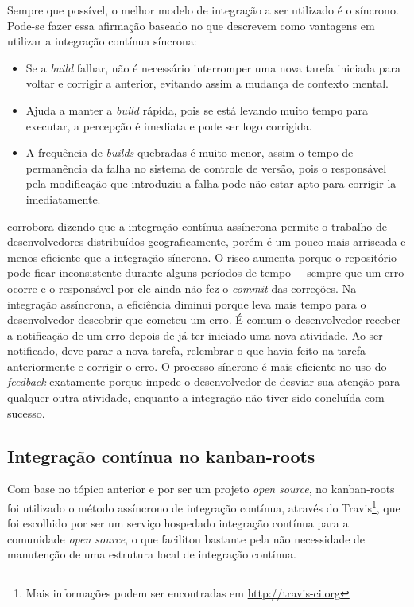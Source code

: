 Sempre que possível, o melhor modelo de integração a ser utilizado é o síncrono. Pode-se fazer essa afirmação baseado no que  descrevem como vantagens em utilizar a integração contínua síncrona:

\begin{itemize}
  \item Se a \textit{build} falhar, não é necessário interromper uma nova tarefa iniciada para voltar e corrigir a anterior, evitando assim a mudança de contexto mental.
  \item Ajuda a manter a \textit{build} rápida, pois se está levando muito tempo para executar, a percepção é imediata e pode ser logo corrigida.
  \item A frequência de \textit{builds} quebradas é muito menor, assim o tempo de permanência da falha no sistema de controle de versão, pois o responsável pela modificação que introduziu a falha pode não estar apto para corrigir-la imediatamente.
\end{itemize}

 corrobora dizendo que a integração contínua assíncrona permite o trabalho de desenvolvedores distribuídos geograficamente, porém é um pouco mais arriscada e menos eficiente que a integração síncrona. O risco aumenta porque o repositório pode ficar inconsistente durante alguns períodos de tempo $-$ sempre que um erro ocorre e o responsável por ele ainda não fez o \textit{commit} das correções. Na integração assíncrona, a eficiência diminui porque leva mais tempo para o desenvolvedor descobrir que cometeu um erro. É comum o desenvolvedor receber a notificação de um erro depois de já ter iniciado uma nova atividade. Ao ser notificado, deve parar a nova tarefa, relembrar o que havia feito na tarefa anteriormente e corrigir o erro. O processo síncrono é mais eficiente no uso do \textit{feedback} exatamente porque impede o desenvolvedor de desviar sua atenção para qualquer outra atividade, enquanto a integração não tiver sido concluída com sucesso.


\subsection{Integração contínua no kanban-roots}
\label{sub:integracao_continua_no_kanban}

Com base no tópico anterior e por ser um projeto \textit{open source}, no kanban-roots foi utilizado o método assíncrono de integração contínua, através do Travis\footnote{Mais informações podem ser encontradas em \url{http://travis-ci.org}}, que foi escolhido por ser um serviço hospedado integração contínua para a comunidade \textit{open source}, o que facilitou bastante pela não necessidade de manutenção de uma estrutura local de integração contínua.

